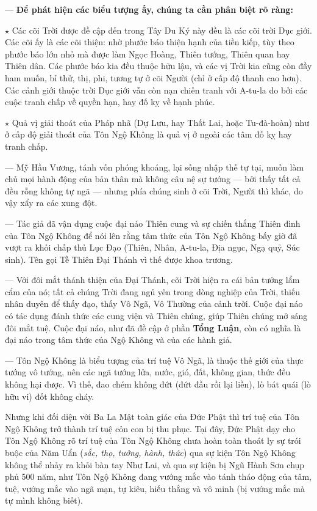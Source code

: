 — {\bf Để phát hiện các biểu tượng ấy, chúng ta cần phân biệt rõ ràng:}

$\star$ Các cõi Trời được đề cập đến trong Tây Du Ký này đều là các cõi trời Dục giới. Các cõi ấy là các cõi thiện: nhờ phước báo thiện hạnh của tiền kiếp, tùy theo phước báo lớn nhỏ mà được làm Ngọc Hoàng, Thiên tướng, Thiên quan hay Thiên dân. Các phước báo kia đều thuộc hữu lậu, và các vị Trời kia cũng còn đầy ham muốn, bỉ thử, thị, phi, tương tự ở cõi Người (chỉ ở cấp độ thanh cao hơn). Các cảnh giới thuộc trời Dục giới vẫn còn nạn chiến tranh với A-tu-la do bởi các cuộc tranh chấp về quyền hạn, hay đố kỵ về hạnh phúc.

$\star$ Quả vị giải thoát của Pháp nhã (Dự Lưu, hay Thất Lai, hoặc Tu-đà-hoàn) như ở cấp độ giải thoát của Tôn Ngộ Không là quả vị ở ngoài các tâm đố kỵ hay tranh chấp.

— Mỹ Hầu Vương, tánh vốn phóng khoáng, lại sống nhập thế tự tại, muốn làm chủ mọi hành động của bản thân mà không câu nệ sự tướng — bởi thấy tất cả đều rỗng không tự ngã — nhưng phía chúng sinh ở cõi Trời, Người thì khác, do vậy xẩy ra các xung đột.

— Tác giả đã vận dụng cuộc đại náo Thiên cung và sự chiến thắng Thiên đình của Tôn Ngộ Không để nói lên rằng tâm thức của Tôn Ngộ Không bấy giờ đã vượt ra khỏi chấp thủ Lục Đạo (Thiên, Nhân, A-tu-la, Địa ngục, Ngạ quỷ, Súc sinh). Tên gọi Tề Thiên Đại Thánh vì thế được khoa trương.

— Với đôi mắt thánh thiện của Đại Thánh, cõi Trời hiện ra cái bản tướng lẩm cẩm của nó; tất cả chúng Trời đang ngủ yên trong dòng nghiệp của Trời, thiếu nhân duyên để thấy đạo, thấy Vô Ngã, Vô Thường của cảnh trời. Cuộc đại náo có tác dụng đánh thức các cung viện và Thiên chúng, giúp Thiên chúng mở sáng đôi mắt tuệ.  Cuộc đại náo, như đã đề cập ở phần \textbf{Tổng Luận}, còn có nghĩa là đại náo trong tâm thức của Ngộ Không và của các hành giả.

— Tôn Ngộ Không là biểu tượng của trí tuệ Vô Ngã, là thuộc thế giới của thực tướng vô tướng, nên các ngã tướng lửa, nước, gió, đất, không gian, thức đều không hại được. Vì thế, đao chém không đứt (đứt đầu rồi lại liền), lò bát quái (lò hữu vi) đốt không cháy.

Nhưng khi đối diện với Ba La Mật toàn giác của Đức Phật thì trí tuệ của Tôn Ngộ Không trở thành trí tuệ cỏn con bị thu phục. Tại đây, Đức Phật dạy cho Tôn Ngộ Không rõ trí tuệ của Tôn Ngộ Không chưa hoàn toàn thoát ly sự trói buộc của Năm Uẩn (\emph{sắc, thọ, tưởng, hành, thức}) qua sự kiện Tôn Ngộ Không không thể nhảy ra khỏi bàn tay Như Lai, và qua sự kiện bị Ngũ Hành Sơn chụp phủ 500 năm, như Tôn Ngộ Không đang vướng mắc vào tánh tháo động của tâm, tuệ, vướng mắc vào ngã mạn, tự kiêu, hiếu thắng và vô minh (bị vướng mắc mà tự mình không biết).

